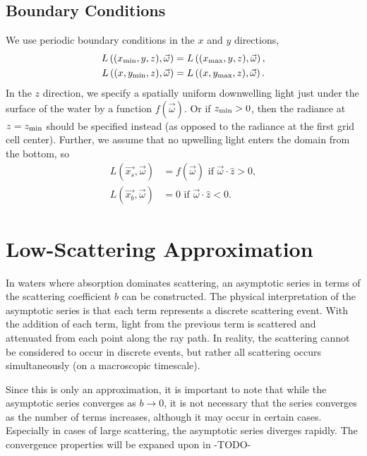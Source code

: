 \subsection{Boundary Conditions}

We use periodic boundary conditions in the $x$ and $y$ directions,
\begin{align*}
  L\left(({x_{\min}}, y, z), \vec{\omega}\right) &= L\left(({x_{\max}}, y, z), \vec{\omega}\right), \\
  L\left((x, {y_{\min}}, z), \vec{\omega}\right) &= L\left((x, {y_{\max}}, z), \vec{\omega}\right).
\end{align*}
In the $z$ direction, we specify a spatially uniform downwelling light just
under the surface of the water by a function $f(\vec{\omega})$.
Or if ${z_{\min}}>0$, then the radiance at $z={z_{\min}}$ should be specified instead (as opposed to the radiance at the first grid cell center).
Further, we assume that no upwelling light enters the domain from the bottom, so
\begin{align*}
  L(\vec{x_s}, \vec{\omega}) &= f(\vec{\omega}) \mbox{ if } \vec{\omega} \cdot \hat{z} > 0, \\
  L(\vec{x_b}, \vec{\omega}) &= 0 \mbox { if } \vec{\omega} \cdot \hat{z} < 0.
\end{align*}

\section{Low-Scattering Approximation}
In waters where absorption dominates scattering, an asymptotic series in terms of the scattering coefficient $b$ can be constructed.
The physical interpretation of the asymptotic series is that each term represents a discrete scattering event.
With the addition of each term, light from the previous term is scattered and attenuated from each point along the ray path.
In reality, the scattering cannot be considered to occur in discrete events, but rather all scattering occurs simultaneously (on a macroscopic timescale).

Since this is only an approximation, it is important to note that while the asymptotic series converges as $b \to 0$, it is not necessary that the series converges as the number of terms increases, although it may occur in certain cases.
Especially in cases of large scattering, the asymptotic series diverges rapidly.
The convergence properties will be expaned upon in -TODO-
